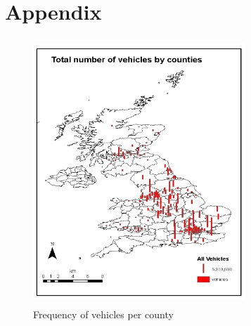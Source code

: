 \documentclass{neu_handout}
\begin{document}
\pagebreak
\section{Appendix}
\begin{figure}[!htb]
  \includegraphics[width=8cm, height=10cm]{vehicles-by-county.png}
  \caption{Frequency of vehicles per county}
\end{figure}
\end{document}
